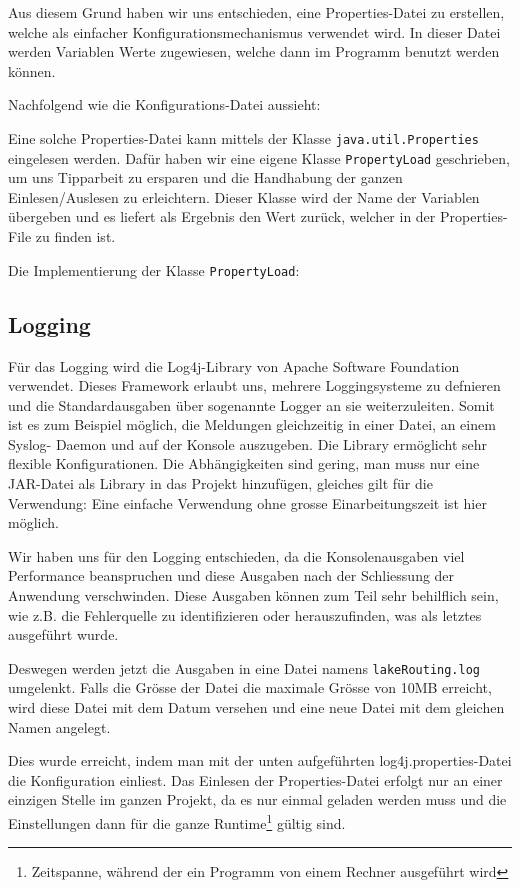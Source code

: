 Aus diesem Grund haben wir uns entschieden, eine Properties-Datei zu
erstellen, welche als einfacher Konfigurationsmechanismus verwendet wird. In
dieser Datei werden Variablen Werte zugewiesen, welche dann im Programm
benutzt werden können.

Nachfolgend wie die Konfigurations-Datei aussieht:



Eine solche Properties-Datei kann mittels der Klasse
\texttt{java.util.Properties} eingelesen werden. Dafür haben wir eine eigene
Klasse \texttt{PropertyLoad} geschrieben, um uns Tipparbeit zu ersparen und
die Handhabung der ganzen Einlesen/Auslesen zu erleichtern. Dieser Klasse wird
der Name der Variablen übergeben und es liefert als Ergebnis den Wert zurück,
welcher in der Properties-File zu finden ist.

Die Implementierung der Klasse \texttt{PropertyLoad}:



\subsection{Logging}
Für das Logging wird die Log4j-Library von Apache Software Foundation
verwendet. Dieses Framework erlaubt uns, mehrere Loggingsysteme zu defnieren
und die Standardausgaben über sogenannte Logger an sie weiterzuleiten. Somit
ist es zum Beispiel möglich, die Meldungen gleichzeitig in einer Datei, an
einem Syslog- Daemon und auf der Konsole auszugeben. Die Library ermöglicht
sehr flexible Konfigurationen. Die Abhängigkeiten sind gering, man muss nur
eine JAR-Datei als Library in das Projekt hinzufügen, gleiches gilt für die
Verwendung: Eine einfache Verwendung ohne grosse Einarbeitungszeit ist hier
möglich.

Wir haben uns für den Logging entschieden, da die Konsolenausgaben viel
Performance beanspruchen und diese Ausgaben nach der Schliessung der Anwendung
verschwinden. Diese Ausgaben können zum Teil sehr behilflich sein, wie z.B.
die Fehlerquelle zu identifizieren oder herauszufinden, was als letztes
ausgeführt wurde. 

Deswegen werden jetzt die Ausgaben in eine Datei namens
\texttt{lakeRouting.log} umgelenkt. Falls die Grösse der Datei die maximale
Grösse von 10MB erreicht, wird diese Datei mit dem Datum versehen und eine
neue Datei mit dem gleichen Namen angelegt.

Dies wurde erreicht, indem man mit der unten aufgeführten
log4j.properties-Datei die Konfiguration einliest. Das Einlesen der
Properties-Datei erfolgt nur an einer einzigen Stelle im ganzen Projekt, da es
nur einmal geladen werden muss und die Einstellungen dann für die ganze
Runtime\footnote{Zeitspanne, während der ein Programm von einem Rechner
ausgeführt wird} gültig sind.


